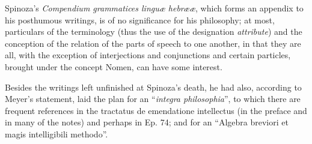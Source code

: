 \documentclass[12pt,a4paper,openany]{book}
\newcommand{\opage}[1]{\marginnote{\footnotesize\textit{[#1]}}}
\begin{document}
\opage{41}Spinoza's \emph{Compendium grammatices linguæ hebrææ}, which forms
an appendix to his posthumous writings, is of no significance for his
philosophy; at most, particulars of the terminology (thus the use of the
designation \emph{attribute}) and the conception of the relation of the
parts of speech to one another, in that they are all, with the exception
of interjections and conjunctions and certain particles, brought under
the concept Nomen, can have some interest.

Besides the writings left unfinished at Spinoza's death, he had also,
according to Meyer's statement, laid the plan for an ``\emph{integra
philosophia}'', to which there are frequent references in the tractatus
de emendatione intellectus (in the preface and in many of the notes) and
perhaps in Ep. 74; and for an ``Algebra breviori et magis intelligibili
methodo''.
\end{document}
